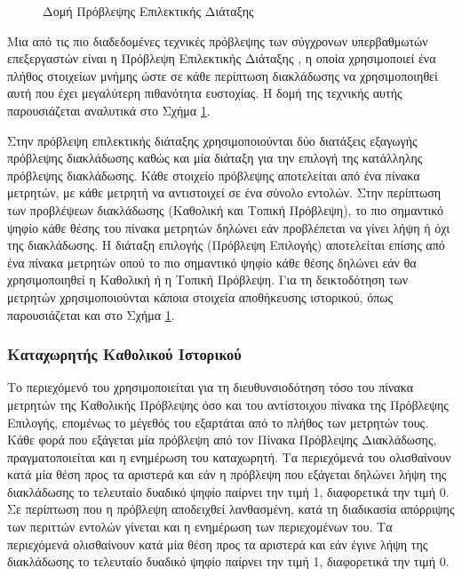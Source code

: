 \begin{figure}[!b]
    \centering
    \caption{Δομή Πρόβλεψης Επιλεκτικής Διάταξης}
    \label{fig:chap2_tournament_predictor}
\end{figure}

Μια από τις πιο διαδεδομένες τεχνικές πρόβλεψης των σύγχρονων υπερβαθμωτών επεξεργαστών είναι η Πρόβλεψη Επιλεκτικής Διάταξης \cite{kessler1998alpha}, η οποία χρησιμοποιεί ένα πλήθος στοιχείων μνήμης ώστε σε κάθε περίπτωση διακλάδωσης να χρησιμοποιηθεί αυτή που έχει μεγαλύτερη πιθανότητα ευστοχίας. Η δομή της τεχνικής αυτής παρουσιάζεται αναλυτικά στο Σχήμα \ref{fig:chap2_tournament_predictor}.
\par
Στην πρόβλεψη επιλεκτικής διάταξης χρησιμοποιούνται δύο διατάξεις εξαγωγής πρόβλεψης διακλάδωσης καθώς και μία διάταξη για την επιλογή της κατάλληλης πρόβλεψης διακλάδωσης. Κάθε στοιχείο πρόβλεψης αποτελείται από ένα πίνακα μετρητών, με κάθε μετρητή να αντιστοιχεί σε ένα σύνολο εντολών. Στην περίπτωση των προβλέψεων διακλάδωσης (Καθολική και Τοπική Πρόβλεψη), το πιο σημαντικό ψηφίο κάθε θέσης του πίνακα μετρητών δηλώνει εάν προβλέπεται να γίνει λήψη ή όχι της διακλάδωσης. Η διάταξη επιλογής (Πρόβλεψη Επιλογής) αποτελείται επίσης από ένα πίνακα μετρητών οπού το πιο σημαντικό ψηφίο κάθε θέσης δηλώνει εάν θα χρησιμοποιηθεί η Καθολική ή η Τοπική Πρόβλεψη. Για τη δεικτοδότηση των μετρητών χρησιμοποιούνται κάποια στοιχεία αποθήκευσης ιστορικού, όπως παρουσιάζεται και στο Σχήμα \ref{fig:chap2_tournament_predictor}.

\subsubsection*{Καταχωρητής Καθολικού Ιστορικού}
\label{chap2_GlobalHistoryBuffer}

Το περιεχόμενό του χρησιμοποιείται για τη διευθυνσιοδότηση τόσο του πίνακα μετρητών της Καθολικής Πρόβλεψης όσο και του αντίστοιχου πίνακα της Πρόβλεψης Επιλογής, επομένως το μέγεθός του εξαρτάται από το πλήθος των μετρητών τους. Κάθε φορά που εξάγεται μία πρόβλεψη από τον Πίνακα Πρόβλεψης Διακλάδωσης, πραγματοποιείται και η ενημέρωση του καταχωρητή. Τα περιεχόμενά του ολισθαίνουν κατά μία θέση προς τα αριστερά και εάν η πρόβλεψη που εξάγεται δηλώνει λήψη της διακλάδωσης το τελευταίο δυαδικό ψηφίο παίρνει την τιμή 1, διαφορετικά την τιμή 0. Σε περίπτωση που η πρόβλεψη αποδειχθεί λανθασμένη, κατά τη διαδικασία απόρριψης των περιττών εντολών γίνεται και η ενημέρωση των περιεχομένων του. Τα περιεχόμενά ολισθαίνουν κατά μία θέση προς τα αριστερά και εάν έγινε λήψη της διακλάδωσης το τελευταίο δυαδικό ψηφίο παίρνει την τιμή 1, διαφορετικά την τιμή 0.

